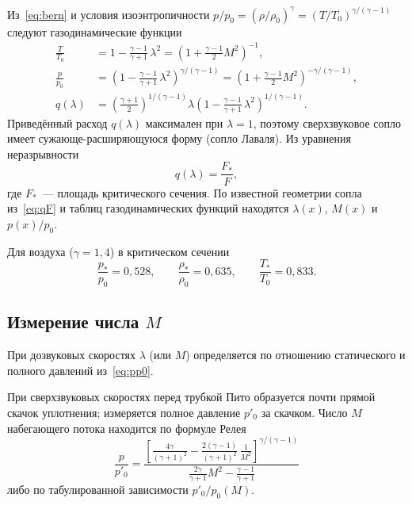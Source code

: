 \documentclass[12pt,a4paper]{article}
\begin{document}
Из~\eqref{eq:bern} и условия изоэнтропичности
$p/p_0 = (\rho/\rho_0)^\gamma = (T/T_0)^{\gamma/(\gamma-1)}$
следуют газодинамические функции
\begin{align}
    \frac{T}{T_0}
    &=
    1 - \frac{\gamma-1}{\gamma+1}\,\lambda^2
    =
    \left(1 + \frac{\gamma-1}{2} M^2\right)^{-1},
    \label{eq:TT0}
    \\
    \frac{p}{p_0}
    &=
    \left(1 - \frac{\gamma-1}{\gamma+1}\,\lambda^2\right)^{\gamma/(\gamma-1)}
    =
    \left(1 + \frac{\gamma-1}{2} M^2\right)^{-\gamma/(\gamma-1)},
    \label{eq:pp0}
    \\
    q(\lambda)
    &=
    \left(\frac{\gamma+1}{2}\right)^{1/(\gamma-1)}
    \lambda
    \left(1 - \frac{\gamma-1}{\gamma+1}\,\lambda^2\right)^{1/(\gamma-1)}.
    \label{eq:qlam}
\end{align}
Приведённый расход $q(\lambda)$ максимален при $\lambda = 1$, поэтому
сверхзвуковое сопло имеет сужающе-расширяющуюся форму (сопло Лаваля).
Из уравнения неразрывности
\begin{equation}
    q(\lambda) = \frac{F_*}{F},
    \label{eq:qF}
\end{equation}
где $F_*$~--- площадь критического сечения. По известной геометрии сопла
из~\eqref{eq:qF} и таблиц газодинамических функций находятся $\lambda(x)$,
$M(x)$ и $p(x)/p_0$.

Для воздуха ($\gamma = 1{,}4$) в критическом сечении
\[
    \frac{p_*}{p_0} = 0{,}528,
    \qquad
    \frac{\rho_*}{\rho_0} = 0{,}635,
    \qquad
    \frac{T_*}{T_0} = 0{,}833.
\]

\subsection{Измерение числа $M$}

При дозвуковых скоростях $\lambda$ (или $M$) определяется по отношению
статического и полного давлений из~\eqref{eq:pp0}.

При сверхзвуковых скоростях перед трубкой Пито образуется почти прямой
скачок уплотнения; измеряется полное давление $p'_0$ за скачком.
Число $M$ набегающего потока находится по формуле Релея
\begin{equation}
    \frac{p}{p'_0}
    =
    \frac
    {\displaystyle
      \left[
        \frac{4\gamma}{(\gamma+1)^2}
        -
        \frac{2(\gamma-1)}{(\gamma+1)^2}\,\frac{1}{M^2}
      \right]^{\gamma/(\gamma-1)}
    }
    {\displaystyle
      \frac{2\gamma}{\gamma+1} M^2 - \frac{\gamma-1}{\gamma+1}
    }
    \label{eq:rayleigh}
\end{equation}
либо по табулированной зависимости $p'_0/p_0(M)$.
\end{document}
